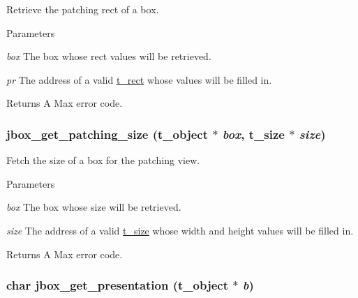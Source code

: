 Retrieve the patching rect of a box. 
\begin{DoxyParams}{Parameters}
\item[{\em box}]The box whose rect values will be retrieved. \item[{\em pr}]The address of a valid \hyperlink{structt__rect}{t\_\-rect} whose values will be filled in. \end{DoxyParams}
\begin{DoxyReturn}{Returns}
A Max error code. 
\end{DoxyReturn}
\hypertarget{group__jbox_ga4b2c0df4da77da3655848defe8f1828e}{
\subsubsection[{jbox\_\-get\_\-patching\_\-size}]{ jbox\_\-get\_\-patching\_\-size ({\bf t\_\-object} $\ast$ {\em box}, \/  {\bf t\_\-size} $\ast$ {\em size})}}
\label{group__jbox_ga4b2c0df4da77da3655848defe8f1828e}


Fetch the size of a box for the patching view. 
\begin{DoxyParams}{Parameters}
\item[{\em box}]The box whose size will be retrieved. \item[{\em size}]The address of a valid \hyperlink{structt__size}{t\_\-size} whose width and height values will be filled in. \end{DoxyParams}
\begin{DoxyReturn}{Returns}
A Max error code. 
\end{DoxyReturn}
\hypertarget{group__jbox_gacbedddaaeeaf5a08a9fa6a8782b86b1f}{
\subsubsection[{jbox\_\-get\_\-presentation}]{\setlength{\rightskip}{0pt plus 5cm}char jbox\_\-get\_\-presentation ({\bf t\_\-object} $\ast$ {\em b})}}
\label{group__jbox_gacbedddaaeeaf5a08a9fa6a8782b86b1f}


